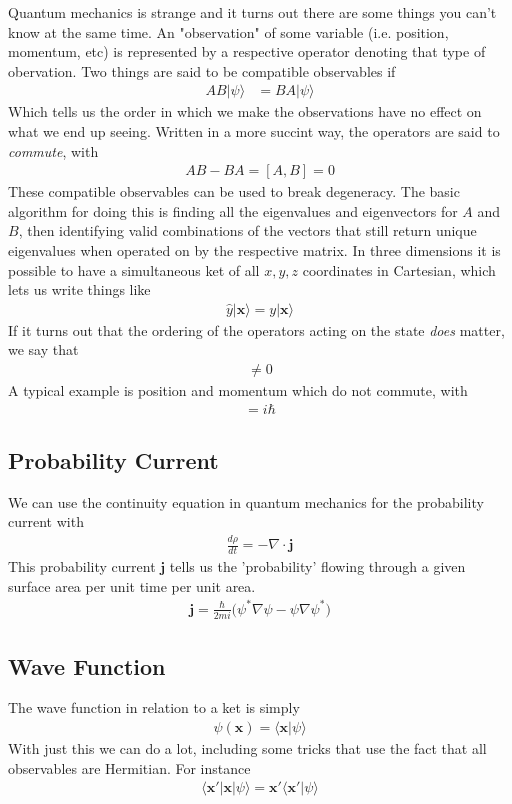 Quantum mechanics is strange and it turns out there are some things you can't know at the same time. An "observation" of some variable (i.e. position, momentum, etc) is represented by a respective operator denoting that type of obervation. Two things are said to be compatible observables if
\begin{align}
AB|\psi\rangle  &= BA |\psi\rangle
\end{align}
Which tells us the order in which we make the observations have no effect on what we end up seeing. Written in a more succint way, the operators are said to \emph{commute}, with
\begin{align}
AB - BA = [A,B] = 0
\end{align}
These compatible observables can be used to break degeneracy. The basic algorithm for doing this is finding all the eigenvalues and eigenvectors for $A$ and $B$, then identifying valid combinations of the vectors that still return unique eigenvalues when operated on by the respective matrix\cite{sakurai}. In three dimensions it is possible to have a simultaneous ket of all $x,y,z$ coordinates in Cartesian, which lets us write things like
\begin{align}
\hat{y}|\textbf{x}\rangle = y|\textbf{x}\rangle
\end{align}
If it turns out that the ordering of the operators acting on the state \emph{does} matter, we say that
\begin{align}
[A,B]\neq 0
\end{align}
A typical example is position and momentum which do not commute, with
\begin{align}
[x,p] = i\hbar
\end{align}

\subsection{Probability Current}
We can use the continuity equation in quantum mechanics for the probability current with
\begin{align}
\frac{d\rho}{dt} = -\nabla\cdot\textbf{j}
\end{align}
This probability current $\textbf{j}$ tells us the 'probability' flowing through a given surface area per unit time per unit area.
\begin{align}
\textbf{j} = \frac{\hbar}{2mi}\Big(\psi^*\nabla\psi - \psi\nabla\psi^*\Big)
\end{align}


\subsection{Wave Function}
The wave function in relation to a ket is simply
\begin{align}
\psi(\textbf{x}) = \langle \textbf{x}|\psi\rangle
\end{align}
With just this we can do a lot, including some tricks that use the fact that all observables are Hermitian. For instance
\begin{align}
\langle \textbf{x}'  | \textbf{x} | \psi\rangle = \textbf{x}'\langle \textbf{x}'|\psi\rangle
\end{align}



